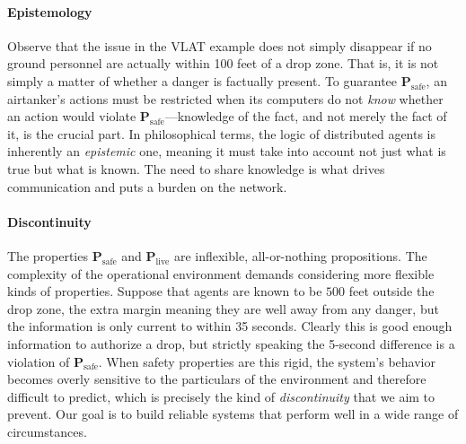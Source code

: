 \documentclass[]             %
{NASA}                       %
\theoremstyle{definition}
\begin{document}
\paragraph{Epistemology}
Observe that the issue in the VLAT example does not simply disappear
if no ground personnel are actually within 100 feet of a drop
zone. That is, it is not simply a matter of whether a danger is
factually present. To guarantee \(\textbf{P}_\textrm{safe}\), an
airtanker's actions must be restricted when its computers do not
\emph{know} whether an action would violate
\(\textbf{P}_\textrm{safe}\)---knowledge of the fact, and not merely
the fact of it, is the crucial part. In philosophical terms, the logic
of distributed agents is inherently an \emph{epistemic} one, meaning
it must take into account not just what is true but what is known. The
need to share knowledge is what drives communication and puts a burden
on the network.

\paragraph{Discontinuity}
The properties $\mathbf{P}_\textrm{safe}$ and
$\mathbf{P}_\textrm{live}$ are inflexible, all-or-nothing
propositions. The complexity of the operational environment demands
considering more flexible kinds of properties. Suppose that agents are
known to be $500$ feet outside the drop zone, the extra margin meaning
they are well away from any danger, but the information is only
current to within 35 seconds. Clearly this is good enough information
to authorize a drop, but strictly speaking the 5-second difference is
a violation of $\mathbf{P}_\textrm{safe}$. When safety properties are
this rigid, the system's behavior becomes overly sensitive to the
particulars of the environment and therefore difficult to predict,
which is precisely the kind of \emph{discontinuity} that we aim to
prevent. Our goal is to build reliable systems that perform well in a
wide range of circumstances.






\end{document}
